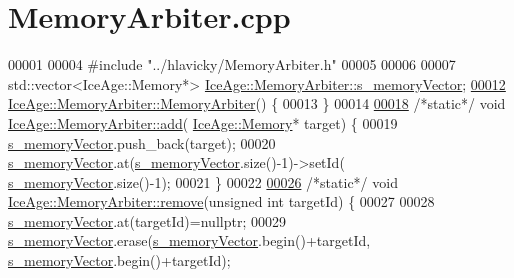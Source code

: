 \hypertarget{MemoryArbiter_8cpp_source}{}\section{Memory\+Arbiter.\+cpp}
\label{MemoryArbiter_8cpp_source}

\begin{DoxyCode}
00001 
00004 \textcolor{preprocessor}{#include "../hlavicky/MemoryArbiter.h"}
00005 
00006 
00007 std::vector<IceAge::Memory*> \hyperlink{classIceAge_1_1MemoryArbiter_a23e5c384f4c4526d7caf0954668d6543}{IceAge::MemoryArbiter::s\_memoryVector};
\hypertarget{MemoryArbiter_8cpp_source.tex_l00012}{}\hyperlink{classIceAge_1_1MemoryArbiter_a1e6bf2eef9d3fb964f6665b94f011024}{00012} \hyperlink{classIceAge_1_1MemoryArbiter_a1e6bf2eef9d3fb964f6665b94f011024}{IceAge::MemoryArbiter::MemoryArbiter}() \{
00013 \}
00014 
\hypertarget{MemoryArbiter_8cpp_source.tex_l00018}{}\hyperlink{classIceAge_1_1MemoryArbiter_a219f22e94979f934a63a0fd28ef889f7}{00018} \textcolor{comment}{/*static*/} \textcolor{keywordtype}{void} \hyperlink{classIceAge_1_1MemoryArbiter_a219f22e94979f934a63a0fd28ef889f7}{IceAge::MemoryArbiter::add}(
      \hyperlink{classIceAge_1_1Memory}{IceAge::Memory}* target) \{
00019     \hyperlink{classIceAge_1_1MemoryArbiter_a23e5c384f4c4526d7caf0954668d6543}{s\_memoryVector}.push\_back(target);
00020     \hyperlink{classIceAge_1_1MemoryArbiter_a23e5c384f4c4526d7caf0954668d6543}{s\_memoryVector}.at(\hyperlink{classIceAge_1_1MemoryArbiter_a23e5c384f4c4526d7caf0954668d6543}{s\_memoryVector}.size()-1)->setId(
      \hyperlink{classIceAge_1_1MemoryArbiter_a23e5c384f4c4526d7caf0954668d6543}{s\_memoryVector}.size()-1);
00021 \}
00022 
\hypertarget{MemoryArbiter_8cpp_source.tex_l00026}{}\hyperlink{classIceAge_1_1MemoryArbiter_a15d44df0d0b3053548af55f5568f8792}{00026} \textcolor{comment}{/*static*/} \textcolor{keywordtype}{void} \hyperlink{classIceAge_1_1MemoryArbiter_a15d44df0d0b3053548af55f5568f8792}{IceAge::MemoryArbiter::remove}(\textcolor{keywordtype}{unsigned} \textcolor{keywordtype}{int} targetId) \{
00027 
00028     \hyperlink{classIceAge_1_1MemoryArbiter_a23e5c384f4c4526d7caf0954668d6543}{s\_memoryVector}.at(targetId)=\textcolor{keyword}{nullptr}; 
00029     \hyperlink{classIceAge_1_1MemoryArbiter_a23e5c384f4c4526d7caf0954668d6543}{s\_memoryVector}.erase(\hyperlink{classIceAge_1_1MemoryArbiter_a23e5c384f4c4526d7caf0954668d6543}{s\_memoryVector}.begin()+targetId, 
      \hyperlink{classIceAge_1_1MemoryArbiter_a23e5c384f4c4526d7caf0954668d6543}{s\_memoryVector}.begin()+targetId);

\end{DoxyCode}
